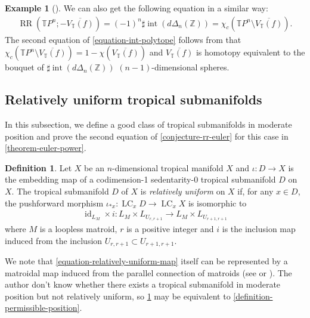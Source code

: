 \documentclass[a4paper,dvipdfmx,reqno,12pt]{amsart}
\theoremstyle{definition}
\newtheorem{definition}[theorem]{Definition}
\newtheorem{example}[theorem]{Example}
\newcommand{\opn}[1]{\operatorname{#1}}
\numberwithin{equation}{section}
\begin{document}
\begin{example}[{\cite[Example 2.11]{demedrano2023chern}}]
We can also get the following equation in a similar way:
\begin{align}
\label{equation-int-polytope}
\opn{RR}(\mathbb{T}P^{n};-\overline{V_{\mathbb{T}}(f)})=
(-1)^{n}\sharp \opn{int}(d\Delta_n(\mathbb{Z}))=
\chi_{c}(\mathbb{T}P^{n}\setminus
\overline{V_{\mathbb{T}}(f)}).
\end{align}
The second equation of \eqref{equation-int-polytope}
follows from that 
$\chi_{c}(\mathbb{T}P^{n}\setminus
\overline{V_{\mathbb{T}}(f)})
=1-\chi (\overline{V_{\mathbb{T}}(f)})$
and $\overline{V_{\mathbb{T}}(f)}$ is homotopy 
equivalent to the bouquet
of $\sharp \opn{int}(d\Delta_n(\mathbb{Z}))$
$(n-1)$-dimensional spheres.
\end{example}


\subsection{Relatively uniform tropical submanifolds}
In this subsection, we define a good class
of tropical submanifolds in moderate position
and prove the second equation of
\cref{conjecture-rr-euler} for this case
in \cref{theorem-euler-power}. 
\begin{definition}
\label{definition-relatively-uniform}
Let $X$ be an $n$-dimensional tropical manifold $X$
and $\iota\colon D\to X$ is the embedding map of
a codimension-1 sedentarity-0 tropical submanifold
$D$ on $X$.
The tropical submanifold $D$ of $X$
is \emph{relatively uniform} on $X$ if, for any $x\in D$, 
the pushforward morphism
$\iota_{*x}\colon\opn{LC}_{x}D\to \opn{LC}_{x}X$ is isomorphic to
\begin{align}
\label{equation-relatively-uniform-map}
\opn{id}_{L_M}\times i\colon L_{M}\times L_{U_{r,r+1}}\to 
L_{M}\times L_{U_{r+1,r+1}}
\end{align}
where
$M$ is a loopless matroid, $r$ is a positive integer
and $i$ is the inclusion map induced from the inclusion
$U_{r,r+1}\subset U_{r+1,r+1}$. 
\end{definition}




We note that \eqref{equation-relatively-uniform-map}
itself can be represented by a matroidal map
induced from the parallel connection of matroids
(see \cite[Lemma 3.1]{MR4246795}
or \cite[Proposition 3.7]{demedrano2023chern}).
The author don't know whether there exists a
tropical submanifold in moderate position but
not relatively uniform, so
\cref{definition-relatively-uniform} may be equivalent
to \cref{definition-permissible-position}.
\end{document}
